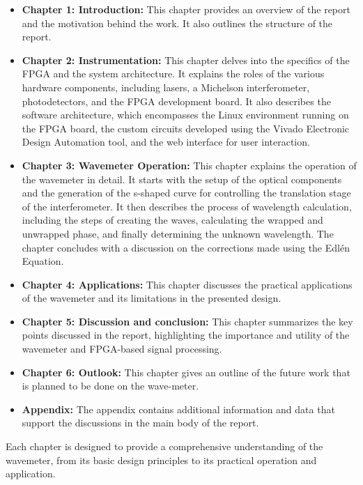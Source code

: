 \documentclass[12pt, twoside]{report}
\begin{document}
\begin{itemize}
\item \textbf{Chapter 1: Introduction:} This chapter provides an overview of the report and the motivation behind the work. It also outlines the structure of the report.

\item \textbf{Chapter 2: Instrumentation:} This chapter delves into the specifics of the FPGA and the system architecture. It explains the roles of the various hardware components, including lasers, a Michelson interferometer, photodetectors, and the FPGA development board. It also describes the software architecture, which encompasses the Linux environment running on the FPGA board, the custom circuits developed using the Vivado Electronic Design Automation tool, and the web interface for user interaction.

\item \textbf{Chapter 3: Wavemeter Operation:} This chapter explains the operation of the wavemeter in detail. It starts with the setup of the optical components and the generation of the s-shaped curve for controlling the translation stage of the interferometer. It then describes the process of wavelength calculation, including the steps of creating the waves, calculating the wrapped and unwrapped phase, and finally determining the unknown wavelength. The chapter concludes with a discussion on the corrections made using the Edlén Equation.

\item \textbf{Chapter 4: Applications:} This chapter discusses the practical applications of the wavemeter and its limitations in the presented design. 

\item \textbf{Chapter 5: Discussion and conclusion:} This chapter summarizes the key points discussed in the report, highlighting the importance and utility of the wavemeter and FPGA-based signal processing.

\item \textbf{Chapter 6: Outlook:} This chapter gives an outline of the future work that is planned to be done on the wave-meter.

\item \textbf{Appendix:} The appendix contains additional information and data that support the discussions in the main body of the report.
\end{itemize}

Each chapter is designed to provide a comprehensive understanding of the wavemeter, from its basic design principles to its practical operation and application.
\end{document}
